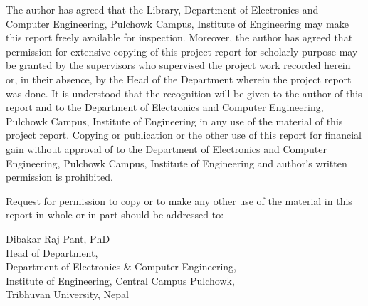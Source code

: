 \vspace{0.5cm}

The author has agreed that the Library, Department of Electronics and Computer Engineering, Pulchowk Campus, Institute of Engineering may make this report freely available for inspection. Moreover, the author has agreed that permission for extensive copying of this project report for scholarly purpose may be granted by the supervisors who supervised the project work recorded herein or, in their absence, by the Head of the Department wherein the project report was done. It is understood that the recognition will be given to the author of this report and to the Department of Electronics and Computer Engineering, Pulchowk Campus, Institute of Engineering in any use of the material of this project report. Copying or publication or the other use of this report for financial gain without approval of to the Department of Electronics and Computer Engineering, Pulchowk Campus, Institute of Engineering and author’s written permission is prohibited.

Request for permission to copy or to make any other use of the material in this report in whole or in part should be addressed to:

\vspace{0.2cm}
\begin{flushleft}

Dibakar Raj Pant, PhD\\
Head of Department,\\
Department of Electronics & Computer 
Engineering, \\
Institute of Engineering, Central Campus 
Pulchowk, \\
Tribhuvan University, Nepal 
\end{flushleft}

